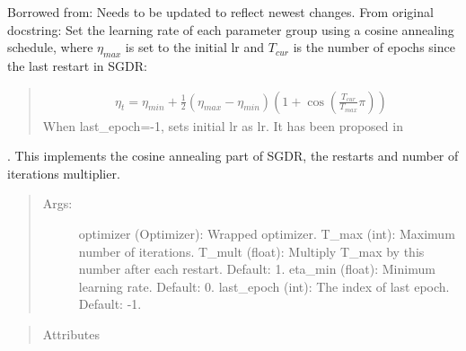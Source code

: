 \documentclass[letterpaper,10pt,english]{sphinxmanual}
\begin{document}
\begin{fulllineitems}
\label{\detokenize{index:methylnet.schedulers.CosineAnnealingWithRestartsLR}}
Borrowed from: 
Needs to be updated to reflect newest changes.
From original docstring:
Set the learning rate of each parameter group using a cosine annealing
schedule, where \(\eta_{max}\) is set to the initial lr and
\(T_{cur}\) is the number of epochs since the last restart in SGDR:
\begin{quote}
\begin{equation*}
\begin{split}\eta_t = \eta_{min} + \frac{1}{2}(\eta_{max} - \eta_{min})(1 +
\cos(\frac{T_{cur}}{T_{max}}\pi))\end{split}
\end{equation*}
When last\_epoch=-1, sets initial lr as lr.
It has been proposed in
\end{quote}

. This implements
the cosine annealing part of SGDR, the restarts and number of iterations multiplier.
\begin{quote}
\begin{description}
\item[{Args:}] \leavevmode
optimizer (Optimizer): Wrapped optimizer.
T\_max (int): Maximum number of iterations.
T\_mult (float): Multiply T\_max by this number after each restart. Default: 1.
eta\_min (float): Minimum learning rate. Default: 0.
last\_epoch (int): The index of last epoch. Default: -1.

\end{description}
\end{quote}
\begin{quote}\begin{description}
\item[{Attributes}] \leavevmode\begin{description}
\item[{}] \leavevmode
\end{description}

\end{description}\end{quote}

\end{fulllineitems}
\end{document}
